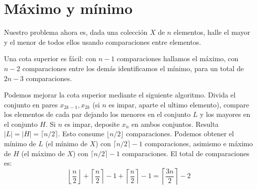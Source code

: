 \section{Máximo y mínimo}
\label{sec:max-min}

  Nuestro problema ahora es,
  dada una colección \(X\) de \(n\) elementos,
  halle el mayor y el menor de todos ellos
  usando comparaciones entre elementos.

  Una cota superior es fácil:
  con \(n - 1\) comparaciones hallamos el máximo,
  con \(n - 2\) comparaciones entre los demás identificamos el mínimo,
  para un total de \(2 n - 3\) comparaciones.

  Podemos mejorar la cota superior mediante el siguiente algoritmo.
  Divida el conjunto en pares \(x_{2 k - 1}, x_{2 k}\)
  (si \(n\) es impar,
   aparte el ultimo elemento),
  compare los elementos de cada par
  dejando los menores en el conjunto \(L\) y los mayores en el conjunto \(H\).
  Si \(n\) es impar,
  deposite \(x_n\) en ambos conjuntos.
  Resulta \(\lvert L \rvert = \lvert H \rvert = \lceil n / 2 \rceil\).
  Esto consume \(\lfloor n / 2 \rfloor\) comparaciones.
  Podemos obtener el mínimo de \(L\)
  (el mínimo de \(X\))
  con \(\lceil n / 2 \rceil - 1\) comparaciones,
  asimismo e máximo de \(H\)
  (el máximo de \(X\))
  con \(\lceil n / 2 \rceil - 1\) comparaciones.
  El total de comparaciones es:
  \begin{equation*}
    \left\lfloor \frac{n}{2} \right\rfloor
      + \left\lceil \frac{n}{2} \right\rceil - 1
      + \left\lceil \frac{n}{2} \right\rceil - 1
      = \left\lceil \frac{3 n}{2} \right\rceil - 2
  \end{equation*}

